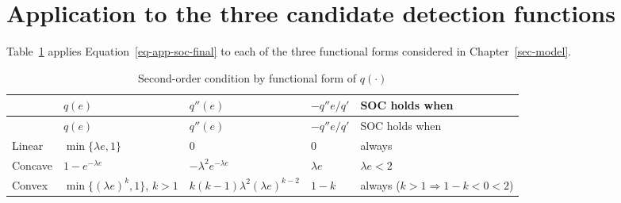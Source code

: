 \documentclass[
  12pt,
  letterpaper,
  oneside,
  openany]{report}
\begin{document}
\section{Application to the three candidate detection
functions}\label{application-to-the-three-candidate-detection-functions}

Table~\ref{tbl-app-soc-forms} applies Equation~\ref{eq-app-soc-final} to
each of the three functional forms considered in
Chapter~\ref{sec-model}.

\begin{longtable}[]{@{}
  >{\raggedright\arraybackslash}p{}
  >{\centering\arraybackslash}p{}
  >{\centering\arraybackslash}p{}
  >{\centering\arraybackslash}p{}
  >{\centering\arraybackslash}p{}@{}}
\caption{Second-order condition by functional form of
\(q(\cdot)\)}\label{tbl-app-soc-forms}\tabularnewline
\toprule\noalign{}
\begin{minipage}[b]{\linewidth}\raggedright
\end{minipage} & \begin{minipage}[b]{\linewidth}\centering
\(q(e)\)
\end{minipage} & \begin{minipage}[b]{\linewidth}\centering
\(q''(e)\)
\end{minipage} & \begin{minipage}[b]{\linewidth}\centering
\(-q''e/q'\)
\end{minipage} & \begin{minipage}[b]{\linewidth}\centering
SOC holds when
\end{minipage} \\
\midrule\noalign{}
\endfirsthead
\toprule\noalign{}
\begin{minipage}[b]{\linewidth}\raggedright
\end{minipage} & \begin{minipage}[b]{\linewidth}\centering
\(q(e)\)
\end{minipage} & \begin{minipage}[b]{\linewidth}\centering
\(q''(e)\)
\end{minipage} & \begin{minipage}[b]{\linewidth}\centering
\(-q''e/q'\)
\end{minipage} & \begin{minipage}[b]{\linewidth}\centering
SOC holds when
\end{minipage} \\
\midrule\noalign{}
\endhead
\bottomrule\noalign{}
\endlastfoot
Linear & \(\min\{\lambda e,1\}\) & \(0\) & \(0\) & always \\
Concave & \(1-e^{-\lambda e}\) & \(-\lambda^2e^{-\lambda e}\) &
\(\lambda e\) & \(\lambda e<2\) \\
Convex & \(\min\{(\lambda e)^k,1\}\), \(k>1\) &
\(k(k-1)\lambda^2(\lambda e)^{k-2}\) & \(1-k\) & always
(\(k>1\Rightarrow1-k<0<2\)) \\
\end{longtable}
\end{document}
